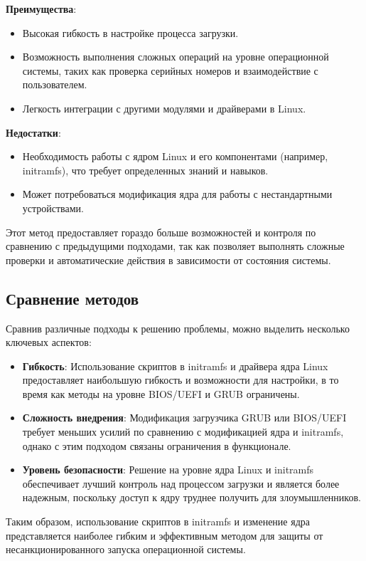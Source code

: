 \documentclass[12pt]{article}
\begin{document}
\textbf{Преимущества}:
\begin{itemize}
    \item Высокая гибкость в настройке процесса загрузки.
    \item Возможность выполнения сложных операций на уровне операционной системы, таких как проверка серийных номеров и взаимодействие с пользователем.
    \item Легкость интеграции с другими модулями и драйверами в Linux.
\end{itemize}

\textbf{Недостатки}:
\begin{itemize}
    \item Необходимость работы с ядром Linux и его компонентами (например, initramfs), что требует определенных знаний и навыков.
    \item Может потребоваться модификация ядра для работы с нестандартными устройствами.
\end{itemize}

Этот метод предоставляет гораздо больше возможностей и контроля по сравнению с предыдущими подходами, так как позволяет выполнять сложные проверки и автоматические действия в зависимости от состояния системы.

\subsection*{Сравнение методов}

Сравнив различные подходы к решению проблемы, можно выделить несколько ключевых аспектов:
\begin{itemize}
    \item \textbf{Гибкость}: Использование скриптов в initramfs и драйвера ядра Linux предоставляет наибольшую гибкость и возможности для настройки, в то время как методы на уровне BIOS/UEFI и GRUB ограничены.
    \item \textbf{Сложность внедрения}: Модификация загрузчика GRUB или BIOS/UEFI требует меньших усилий по сравнению с модификацией ядра и initramfs, однако с этим подходом связаны ограничения в функционале.
    \item \textbf{Уровень безопасности}: Решение на уровне ядра Linux и initramfs обеспечивает лучший контроль над процессом загрузки и является более надежным, поскольку доступ к ядру труднее получить для злоумышленников.
\end{itemize}

Таким образом, использование скриптов в initramfs и изменение ядра представляется наиболее гибким и эффективным методом для защиты от несанкционированного запуска операционной системы.
\end{document}
